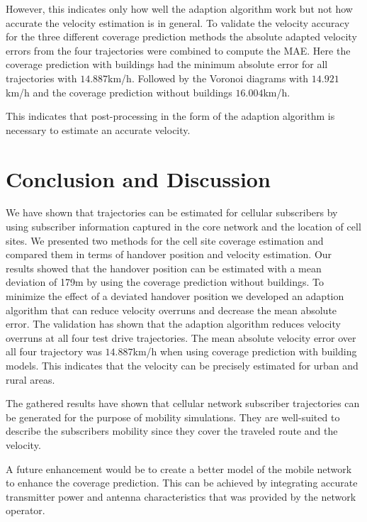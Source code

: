 \documentclass[twocolumn]{bmcart}%
\begin{document}
However, this indicates only how well the adaption algorithm work but not how accurate the velocity estimation is in general. To validate the velocity accuracy for the three different coverage prediction methods the absolute adapted velocity errors from the four trajectories were combined to compute the MAE. Here the coverage prediction with buildings had the minimum absolute error for all trajectories with $14.887$km/h. Followed by the Voronoi diagrams with $14.921$km/h and the coverage prediction without buildings $16.004$km/h. 

This indicates that post-processing in the form of the adaption algorithm is necessary to estimate an accurate velocity. 

\section*{Conclusion and Discussion}
We have shown that trajectories can be estimated for cellular subscribers by using subscriber information captured in the core network and the location of cell sites. We presented two methods for the cell site coverage estimation and compared them in terms of handover position and velocity estimation. Our results showed that the handover position can be estimated with a mean deviation of 179m by using the coverage prediction without buildings. To minimize the effect of a deviated handover position we developed an adaption algorithm that can reduce velocity overruns and decrease the mean absolute error. The validation has shown that the adaption algorithm reduces velocity overruns at all four test drive trajectories. The mean absolute velocity error over all four trajectory was $14.887$km/h when using coverage prediction with building models. This indicates that the velocity can be precisely estimated for urban and rural areas.

The gathered results have shown that cellular network subscriber trajectories can be generated for the purpose of mobility simulations. They are well-suited to describe the subscribers mobility since they cover the traveled route and the velocity.

A future enhancement would be to create a better model of the mobile network to enhance the coverage prediction. This can be achieved by integrating accurate transmitter power and antenna characteristics that was provided by the network operator.

\end{document}
